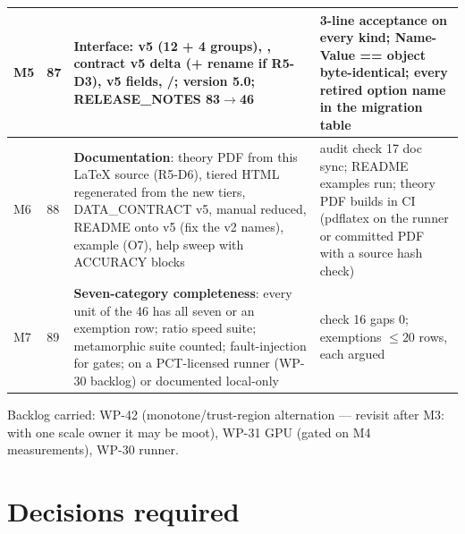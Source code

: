 \begin{longtable}{@{}P{9mm}P{9mm}P{86mm}P{50mm}@{}}
\midrule
M5 & 87 & \textbf{Interface}:  v5 (12 + 4 groups), , contract v5 delta (+ rename if R5-D3),  v5 fields, /; version 5.0; RELEASE\_NOTES 83$\to$46 & 3-line acceptance on every kind; Name-Value == object byte-identical; every retired option name in the migration table\\
\midrule
M6 & 88 & \textbf{Documentation}: theory PDF from this LaTeX source (R5-D6), tiered HTML regenerated from the new tiers, DATA\_CONTRACT v5, manual reduced, README onto v5 (fix the v2 names),  example (O7), help sweep with ACCURACY blocks & audit check 17 doc sync; README examples run; theory PDF builds in CI (pdflatex on the runner or committed PDF with a source hash check)\\
\midrule
M7 & 89 & \textbf{Seven-category completeness}: every unit of the 46 has all seven or an exemption row; ratio speed suite; metamorphic suite counted; fault-injection for gates;  on a PCT-licensed runner (WP-30 backlog) or documented local-only & check 16 gaps 0; exemptions $\le 20$ rows, each argued\\
\bottomrule
\end{longtable}

Backlog carried: WP-42 (monotone/trust-region alternation --- revisit after M3: with one scale owner it may be moot), WP-31 GPU (gated on M4 measurements), WP-30 runner.

\section{Decisions required}
\label{sec:decisions}

